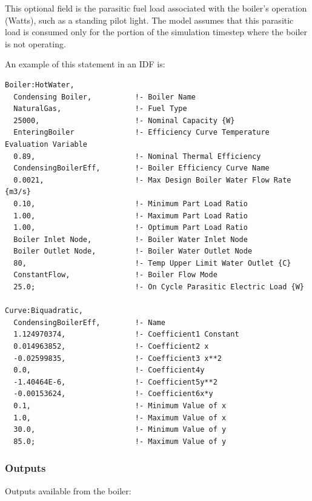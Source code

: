 This optional field is the parasitic fuel load associated with the boiler's operation (Watts), such as a standing pilot light. The model assumes that this parasitic load is consumed only for the portion of the simulation timestep where the boiler is not operating.

An example of this statement in an IDF is:

\begin{lstlisting}
Boiler:HotWater,
  Condensing Boiler,          !- Boiler Name
  NaturalGas,                 !- Fuel Type
  25000,                      !- Nominal Capacity {W}
  EnteringBoiler              !- Efficiency Curve Temperature Evaluation Variable
  0.89,                       !- Nominal Thermal Efficiency
  CondensingBoilerEff,        !- Boiler Efficiency Curve Name
  0.0021,                     !- Max Design Boiler Water Flow Rate {m3/s}
  0.10,                       !- Minimum Part Load Ratio
  1.00,                       !- Maximum Part Load Ratio
  1.00,                       !- Optimum Part Load Ratio
  Boiler Inlet Node,          !- Boiler Water Inlet Node
  Boiler Outlet Node,         !- Boiler Water Outlet Node
  80,                         !- Temp Upper Limit Water Outlet {C}
  ConstantFlow,               !- Boiler Flow Mode
  25.0;                       !- On Cycle Parasitic Electric Load {W}

Curve:Biquadratic,
  CondensingBoilerEff,        !- Name
  1.124970374,                !- Coefficient1 Constant
  0.014963852,                !- Coefficient2 x
  -0.02599835,                !- Coefficient3 x**2
  0.0,                        !- Coefficient4y
  -1.40464E-6,                !- Coefficient5y**2
  -0.00153624,                !- Coefficient6x*y
  0.1,                        !- Minimum Value of x
  1.0,                        !- Maximum Value of x
  30.0,                       !- Minimum Value of y
  85.0;                       !- Maximum Value of y
\end{lstlisting}

\subsubsection{Outputs}\label{outputs-10-005}

Outputs available from the boiler:

